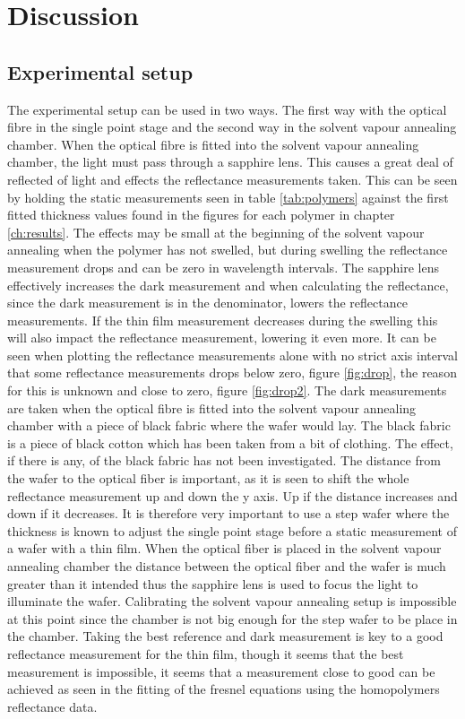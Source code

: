 \documentclass[MasterThesisMain.tex]{subfiles}
\begin{document}
\chapter{Discussion} \label{ch:discussion}

\section{Experimental setup}
The experimental setup can be used in two ways. The first way with the optical fibre in the single point stage and the second way in the solvent vapour annealing chamber. When the optical fibre is fitted into the solvent vapour annealing chamber, the light must pass through a sapphire lens. This causes a great deal of reflected of light and effects the reflectance measurements taken. This can be seen by holding the static measurements seen in table \ref{tab:polymers} against the first fitted thickness values found in the figures for each polymer in chapter \ref{ch:results}. The effects may be small at the beginning of the solvent vapour annealing when the polymer has not swelled, but during swelling the reflectance measurement drops and can be zero in wavelength intervals. The sapphire lens effectively increases the dark measurement and when calculating the reflectance, since the dark measurement is in the denominator, lowers the reflectance measurements. If the thin film measurement decreases during the swelling this will also impact the reflectance measurement, lowering it even more. It can be seen when plotting the reflectance measurements alone with no strict axis interval that some reflectance measurements drops below zero, figure \ref{fig:drop}, the reason for this is unknown and close to zero, figure \ref{fig:drop2}. The dark measurements are taken when the optical fibre is fitted into the solvent vapour annealing chamber with a piece of black fabric where the wafer would lay. The black fabric is a piece of black cotton which has been taken from a bit of clothing. The effect, if there is any, of the black fabric has not been investigated. The distance from the wafer to the optical fiber is important, as it is seen to shift the whole reflectance measurement up and down the y axis. Up if the distance increases and down if it decreases. It is therefore very important to use a step wafer where the thickness is known to adjust the single point stage before a static measurement of a wafer with a thin film. When the optical fiber is placed in the solvent vapour annealing chamber the distance between the optical fiber and the wafer is much greater than it intended thus the sapphire lens is used to focus the light to illuminate the wafer. Calibrating the solvent vapour annealing setup is impossible at this point since the chamber is not big enough for the step wafer to be place in the chamber. Taking the best reference and dark measurement is key to a good reflectance measurement for the thin film, though it seems that the best measurement is impossible, it seems that a measurement close to good can be achieved as seen in the fitting of the fresnel equations using the homopolymers reflectance data.
\end{document}
